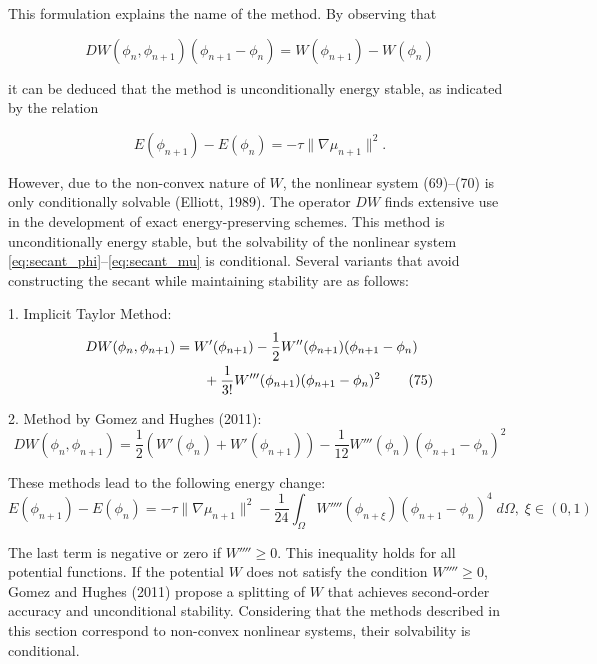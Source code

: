 \documentclass{article}
\begin{document}
This formulation explains the name of the method. By observing that

\begin{equation}
DW(\phi_n, \phi_{n+1})(\phi_{n+1} - \phi_n) = W(\phi_{n+1}) - W(\phi_n)
\end{equation}

it can be deduced that the method is unconditionally energy stable, as indicated by the relation

\begin{equation}
E(\phi_{n+1}) - E(\phi_n) = -\tau \|\nabla \mu_{n+1}\|^2.
\end{equation}

However, due to the non-convex nature of \(W\), the nonlinear system (69)–(70) is only conditionally solvable (Elliott, 1989). The operator \(DW\)  finds extensive use in the development of exact energy-preserving schemes. This method is unconditionally energy stable, but the solvability of the nonlinear system \eqref{eq:secant_phi}--\eqref{eq:secant_mu} is conditional.
Several variants that avoid constructing the secant while maintaining stability are as follows:

1. Implicit Taylor Method:
\begin{align}
DW(\phi_n, \phi_{n+1}) &= W'(\phi_{n+1}) - \frac{1}{2}W''(\phi_{n+1})(\phi_{n+1} - \phi_n) \notag\\
&\qquad + \frac{1}{3!}W'''(\phi_{n+1})(\phi_{n+1} - \phi_n)^2 \tag{75}
\end{align}

2. Method by Gomez and Hughes (2011):
\begin{equation}
DW(\phi_n, \phi_{n+1}) = \frac{1}{2}\left(W'(\phi_n) + W'(\phi_{n+1})\right) - \frac{1}{12}W'''(\phi_n)(\phi_{n+1} - \phi_n)^2 \tag{76}
\end{equation}

These methods lead to the following energy change:
\begin{equation}
E(\phi_{n+1}) - E(\phi_n) = -\tau \|\nabla \mu_{n+1}\|^2 - \frac{1}{24}\int_{\Omega}W''''(\phi_{n+\xi})(\phi_{n+1} - \phi_n)^4 \; d\Omega, \; \xi \in (0, 1) \tag{77}
\end{equation}

The last term is negative or zero if \(W'''' \geq 0\). This inequality holds for all potential functions. If the potential \(W\) does not satisfy the condition \(W'''' \geq 0\), Gomez and Hughes (2011) propose a splitting of \(W\) that achieves second-order accuracy and unconditional stability.
Considering that the methods described in this section correspond to non-convex nonlinear systems, their solvability is conditional.
\end{document}
